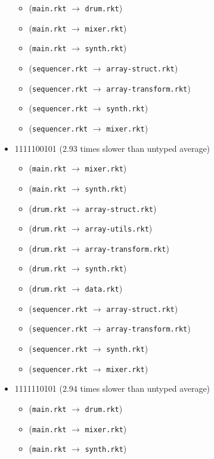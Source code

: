 \documentclass{article}
\newcommand{\mono}[1]{\texttt{#1}}
\begin{document}
\begin{itemize}
  \begin{itemize}
  \item (\mono{main.rkt} $\rightarrow$ \mono{drum.rkt})
  \item (\mono{main.rkt} $\rightarrow$ \mono{mixer.rkt})
  \item (\mono{main.rkt} $\rightarrow$ \mono{synth.rkt})
  \item (\mono{sequencer.rkt} $\rightarrow$ \mono{array-struct.rkt})
  \item (\mono{sequencer.rkt} $\rightarrow$ \mono{array-transform.rkt})
  \item (\mono{sequencer.rkt} $\rightarrow$ \mono{synth.rkt})
  \item (\mono{sequencer.rkt} $\rightarrow$ \mono{mixer.rkt})
  \end{itemize}
\item 1111100101 (2.93 times slower than untyped average)
  \begin{itemize}
  \item (\mono{main.rkt} $\rightarrow$ \mono{mixer.rkt})
  \item (\mono{main.rkt} $\rightarrow$ \mono{synth.rkt})
  \item (\mono{drum.rkt} $\rightarrow$ \mono{array-struct.rkt})
  \item (\mono{drum.rkt} $\rightarrow$ \mono{array-utils.rkt})
  \item (\mono{drum.rkt} $\rightarrow$ \mono{array-transform.rkt})
  \item (\mono{drum.rkt} $\rightarrow$ \mono{synth.rkt})
  \item (\mono{drum.rkt} $\rightarrow$ \mono{data.rkt})
  \item (\mono{sequencer.rkt} $\rightarrow$ \mono{array-struct.rkt})
  \item (\mono{sequencer.rkt} $\rightarrow$ \mono{array-transform.rkt})
  \item (\mono{sequencer.rkt} $\rightarrow$ \mono{synth.rkt})
  \item (\mono{sequencer.rkt} $\rightarrow$ \mono{mixer.rkt})
  \end{itemize}
\item 1111110101 (2.94 times slower than untyped average)
  \begin{itemize}
  \item (\mono{main.rkt} $\rightarrow$ \mono{drum.rkt})
  \item (\mono{main.rkt} $\rightarrow$ \mono{mixer.rkt})
  \item (\mono{main.rkt} $\rightarrow$ \mono{synth.rkt})

\end{itemize}
\end{itemize}
\end{document}
